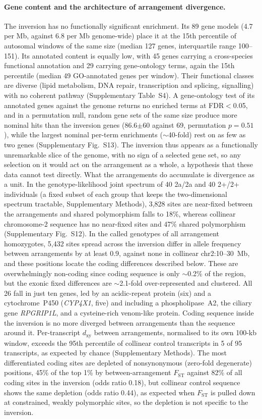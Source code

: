 \documentclass[11pt]{article}
\newcommand{\Fst}{F_\mathrm{ST}}
\newcommand{\dxy}{d_\mathrm{xy}}
\begin{document}
\paragraph{Gene content and the architecture of arrangement divergence.}
The inversion has no functionally significant enrichment. Its 89 gene models (4.7 per Mb, against 6.8 per Mb genome-wide) 
place it at the 15th percentile of autosomal windows of the same size (median 127 genes, interquartile range 100--151). Its annotated content is equally low, with 45 genes carrying a cross-species functional annotation and 29 carrying gene-ontology terms, again the 15th percentile (median 49 GO-annotated genes per window). Their functional classes 
are diverse (lipid metabolism, DNA repair, transcription and splicing, signalling) with no coherent pathway 
(Supplementary Table~S4). A gene-ontology test of its annotated genes against the genome
returns no enriched terms at FDR$<$0.05, and in a permutation null, random gene sets of the same size produce more nominal hits than the inversion genes (86.6$\pm$60 against 69, permutation $p=0.51$),
while the largest nominal per-term enrichments ($\sim$40-fold) rest on as few as two genes (Supplementary Fig.~S13).
The inversion thus appears as a functionally unremarkable slice of the genome,
with no sign of a selected gene set, so any selection on it would act on the arrangement as a whole, a hypothesis that these data cannot test directly. What the arrangements do accumulate is divergence as a unit. In the genotype-likelihood joint spectrum of 40 2a/2a and 40 2+/2+ individuals (a fixed subset of each group that keeps the two-dimensional spectrum tractable, Supplementary Methods), 3{,}828 sites are near-fixed between the arrangements and shared polymorphism falls to
18\%, whereas collinear chromosome-2 sequence has no near-fixed sites and 47\% shared polymorphism (Supplementary
Fig.~S12). In the called genotypes of all arrangement homozygotes, 5{,}432 sites spread across the inversion differ in
allele frequency between arrangements by at least 0.9, against none in collinear chr2:10--30~Mb, and these positions
locate the coding differences described below. These are
overwhelmingly non-coding since coding sequence is only $\sim$0.2\% of the region, but the exonic fixed
differences are $\sim$2.1-fold over-represented and clustered. All 26 fall in just ten genes, led by an 
acidic-repeat protein (six) and a cytochrome~P450 (\textit{CYP4X1}, five) and including a phospholipase~A2, 
the ciliary gene \textit{RPGRIP1L}, and a cysteine-rich venom-like protein.
Coding sequence inside the inversion is no more diverged between arrangements than the sequence around it. 
Per-transcript $\dxy$ between arrangements, normalised to its own 100-kb window, exceeds the 95th percentile of 
collinear control transcripts in 5 of 95 transcripts, as expected by chance (Supplementary Methods). 
The most differentiated coding sites are depleted of nonsynonymous (zero-fold degenerate) positions, 45\% of the 
top 1\% by between-arrangement $\Fst$ against 82\% of all coding sites in the inversion (odds ratio 0.18), but 
collinear control sequence shows the same depletion (odds ratio 0.44), as expected when $\Fst$ is pulled down at 
constrained, weakly polymorphic sites, so the depletion is not specific to the inversion. 
\end{document}
